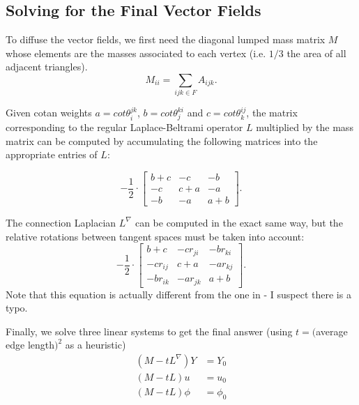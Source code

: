 \documentclass{article}
\begin{document}
\subsection{Solving for the Final Vector Fields}
To diffuse the vector fields, we first need the diagonal lumped mass matrix $M$
whose elements are the masses associated to each vertex (i.e. $1/3$ the area of
all adjacent triangles).
\begin{equation}\label{eqn:lumpedmass}
  M_{ii} = \sum_{{ijk} \in F} A_{ijk}.
\end{equation}

Given cotan weights $a = cot\theta_{i}^{jk}$, $b = cot\theta_{j}^{ki}$ and
$c = cot \theta_{k}^{ij}$, the matrix corresponding to the regular
Laplace-Beltrami operator $L$ multiplied by the mass matrix can be computed by
accumulating the following matrices into the appropriate entries of $L$:

\begin{equation}\label{eqn:laplacebeltrami}
  -\frac12 \cdot \left[
  \begin{array}{ccc}
    b + c & -c & -b \\
    -c & c + a & -a \\
    -b & -a & a+b
    \end{array}\right].
\end{equation}

The connection Laplacian $L^{\nabla}$ can be computed in the exact same way, but the relative
rotations between tangent spaces must be taken into account:
\begin{equation}\label{eqn:connectionlaplacian}
  -\frac12 \cdot \left[
  \begin{array}{ccc}
    b + c & -cr_{ji} & -br_{ki} \\
    -cr_{ij} & c + a & -ar_{kj} \\
    -br_{ik} & -ar_{jk} & a+b
    \end{array}\right].
\end{equation}
Note that this equation is actually different from the one in
\cite{Sharp:2019:VHM} - I suspect there is a typo.

Finally, we solve three linear systems to get the final answer (using
$t = (${average edge length}$)^{2}$ as a heuristic)
\begin{align*}
  (M - tL^{\nabla})Y &= Y_{0} \\
  (M - tL)u &= u_{0} \\
  (M - tL)\phi &= \phi_{0}
\end{align*}
\end{document}
